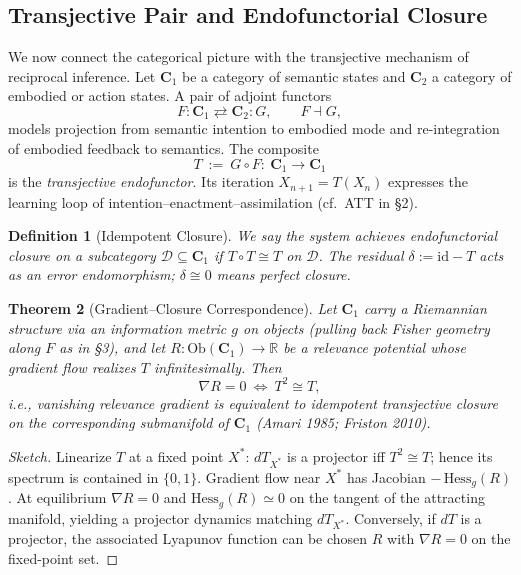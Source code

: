 \documentclass[12pt,a4paper,twoside,openright]{book}
\newtheorem{theorem}{Theorem}
\newtheorem{definition}[theorem]{Definition}
\begin{document}
\subsection{Transjective Pair and Endofunctorial Closure}
We now connect the categorical picture with the transjective mechanism of reciprocal inference. Let $\mathbf{C}_1$ be a category of semantic states and $\mathbf{C}_2$ a category of embodied or action states. A pair of adjoint functors
\[
F:\mathbf{C}_1\rightleftarrows \mathbf{C}_2:G,\qquad F\dashv G,
\]
models projection from semantic intention to embodied mode and re-integration of embodied feedback to semantics. The composite
\[
T\ :=\ G\circ F:\ \mathbf{C}_1\to\mathbf{C}_1
\]
is the \emph{transjective endofunctor}. Its iteration $X_{n+1}=T(X_n)$ expresses the learning loop of intention–enactment–assimilation (cf.\ ATT in §2).

\begin{definition}[Idempotent Closure]
We say the system achieves \emph{endofunctorial closure} on a subcategory $\mathcal{D}\subseteq \mathbf{C}_1$ if $T\circ T\cong T$ on $\mathcal{D}$. The residual $\delta:=\mathrm{id}-T$ acts as an error endomorphism; $\delta\cong 0$ means perfect closure.
\end{definition}

\begin{theorem}[Gradient–Closure Correspondence]
Let $\mathbf{C}_1$ carry a Riemannian structure via an information metric $g$ on objects (pulling back Fisher geometry along $F$ as in §3), and let $R:\mathrm{Ob}(\mathbf{C}_1)\to\mathbb{R}$ be a relevance potential whose gradient flow realizes $T$ infinitesimally. Then
\[
\nabla R=0\ \Longleftrightarrow\ T^2\cong T,
\]
i.e., vanishing relevance gradient is equivalent to idempotent transjective closure on the corresponding submanifold of $\mathbf{C}_1$ (Amari 1985; Friston 2010).
\end{theorem}

\begin{proof}[Sketch]
Linearize $T$ at a fixed point $X^\ast$: $dT_{X^\ast}$ is a projector iff $T^2\cong T$; hence its spectrum is contained in $\{0,1\}$. Gradient flow near $X^\ast$ has Jacobian $-\,\mathrm{Hess}_g(R)$. At equilibrium $\nabla R=0$ and $\mathrm{Hess}_g(R)\simeq 0$ on the tangent of the attracting manifold, yielding a projector dynamics matching $dT_{X^\ast}$. Conversely, if $dT$ is a projector, the associated Lyapunov function can be chosen $R$ with $\nabla R=0$ on the fixed-point set.
\end{proof}
\end{document}

